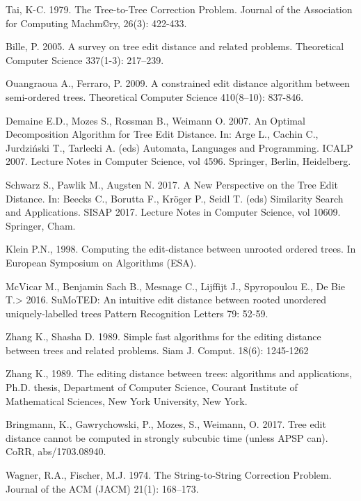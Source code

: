 \documentclass{article}
\begin{document}
\begin{thebibliography}{99}

 Tai, K-C. 1979. The Tree-to-Tree Correction Problem. Journal of the Association for Computing Machm©ry, 26(3): 422-433.

 Bille, P. 2005. A survey on tree edit distance and related problems. Theoretical Computer Science 337(1-3): 217–239.

 Ouangraoua A., Ferraro, P. 2009. A constrained edit distance algorithm between semi-ordered trees. Theoretical Computer Science 410(8–10): 837-846.

 Demaine E.D., Mozes S., Rossman B., Weimann O. 2007. An Optimal Decomposition Algorithm for Tree Edit Distance. In: Arge L., Cachin C., Jurdziński T., Tarlecki A. (eds) Automata, Languages and Programming. ICALP 2007. Lecture Notes in Computer Science, vol 4596. Springer, Berlin, Heidelberg.

 Schwarz S., Pawlik M., Augsten N. 2017. A New Perspective on the Tree Edit Distance. In: Beecks C., Borutta F., Kröger P., Seidl T. (eds) Similarity Search and Applications. SISAP 2017. Lecture Notes in Computer Science, vol 10609. Springer, Cham.

 Klein P.N., 1998. Computing the edit-distance between unrooted ordered trees. In European Symposium on Algorithms (ESA). 

 McVicar M., Benjamin Sach B., Mesnage C., Lijffijt J., Spyropoulou E., De Bie T.> 2016. SuMoTED: An intuitive edit distance between rooted unordered uniquely-labelled trees Pattern Recognition Letters 79: 52-59.

 Zhang K., Shasha D. 1989. Simple fast algorithms for the editing distance between trees and related problems. Siam J. Comput. 18(6): 1245-1262

 Zhang K., 1989. The editing distance between trees: algorithms and applications, Ph.D. thesis, Department
of Computer Science, Courant Institute of Mathematical Sciences, New York University, New York.

 Bringmann, K., Gawrychowski, P., Mozes, S., Weimann, O. 2017. Tree edit distance cannot be computed in strongly subcubic time (unless APSP can). CoRR, abs/1703.08940.

  Wagner, R.A., Fischer, M.J. 1974. The String-to-String Correction Problem. Journal of the ACM (JACM) 21(1): 168–173. 


\end{thebibliography}
\end{document}

